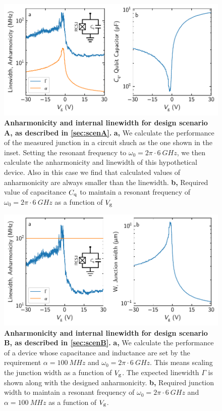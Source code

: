\documentclass[preprint,
  onecolumn,
  notitlepage,
  amsmath,amssymb,
  aip,
  apl,
]{revtex4-1}
\begin{document}
\begin{figure}[]
    \centering
    \includegraphics[width=.9\linewidth]{figs/supp_anharmonicity_2.pdf}
    \caption{{\bf Anharmonicity and internal linewidth for design scenario A, as described in \ref{sec:scenA}.}
        \textbf{a,} We calculate the performance of the measured junction in a circuit shuch as the one shown in the inset.
        Setting the resonant frequency to $\omega_0 = 2\pi\cdot\SI{6}{GHz}$, we then calculate the anharmonicity and linewidth of this hypothetical device.
        Also in this case we find that calculated values of anharmonicity are always smaller than the linewidth.
        \textbf{b,} Required value of capacitance $C_{\rm q}$ to maintain a resonant frequency of $\omega_0 = 2\pi\cdot\SI{6}{GHz}$ as a function of $V_{\rm g}$}
    \label{fig:anharm2}
\end{figure}

\begin{figure}[]
    \centering
    \includegraphics[width=.9\linewidth]{figs/supp_anharmonicity_3.pdf}
    \caption{{\bf Anharmonicity and internal linewidth for design scenario B, as described in \ref{sec:scenB}.}
        \textbf{a,} We calculate the performance of a device whose capacitance and inductance are set by the requirement $\alpha = \SI{100}{MHz}$ and $\omega_0 = 2\pi\cdot\SI{6}{GHz}$.  This means scaling the junction width as a function of $V_{\rm g}$.  The expected linewidth $\Gamma$ is shown along with the designed anharmonicity.
        \textbf{b,} Required junction width to maintain a resonant frequency of $\omega_0 = 2\pi\cdot\SI{6}{GHz}$ and $\alpha = \SI{100}{MHz}$ as a function of $V_{\rm g}$.}
    \label{fig:anharm3}
\end{figure}
\end{document}
